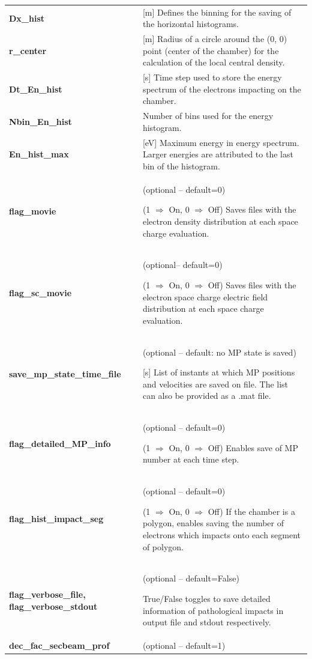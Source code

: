 \documentclass[a4paper,12pt]{article}
\begin{document}
\begin{longtable}{p{}p{}}
\hline\endfirsthead\hline\endhead\rowcolor{Gray}
\multicolumn{2}{p{.97\textwidth}}{
\textbf{Saving settings}
}\\ \hline
\textbf{Dx\_hist}& 	[m] Defines the binning for the saving of the horizontal histograms.\\ \hline
\textbf{r\_center}&	[m] Radius of a circle around the (0, 0) point (center of the chamber) for the calculation of the local central density.\\ \hline
\textbf{Dt\_En\_hist}&	[s] Time step used to store the energy spectrum  of the electrons impacting on the chamber.\\ \hline
\textbf{Nbin\_En\_hist}&	Number of bins used for the energy histogram.\\ \hline
\textbf{En\_hist\_max}& 	[eV] Maximum energy in energy spectrum. Larger energies are attributed to the last bin of the histogram.	\\ \hline
\textbf{flag\_movie}&	(optional -- default=0)

(1 $\Rightarrow$ On, 0 $\Rightarrow$ Off) Saves files with the electron density distribution at each space charge evaluation.\\ \hline
\textbf{flag\_sc\_movie}&	(optional-- default=0)

(1 $\Rightarrow$ On, 0 $\Rightarrow$ Off) Saves files with the electron space charge electric field distribution at each space charge evaluation.\\ \hline
\textbf{save\_mp\_state\_time\_file}&	(optional -- default: no MP state is saved)

[s] List of instants at which MP positions and velocities are saved on file. The list can also be provided as a .mat file.\\ \hline
\textbf{flag\_detailed\_MP\_info}&	(optional -- default=0)

(1 $\Rightarrow$ On, 0 $\Rightarrow$ Off) Enables save of MP number at each time step.\\ \hline
\textbf{flag\_hist\_impact\_seg}&	(optional -- default=0)

(1 $\Rightarrow$ On, 0 $\Rightarrow$ Off) If the chamber is a polygon, enables saving the number of electrons which impacts onto each segment of polygon.\\ \hline
\textbf{flag\_verbose\_file, flag\_verbose\_stdout}&	(optional -- default=False)

True/False toggles to save detailed information of pathological impacts in output file and stdout respectively.\\ \hline
\textbf{dec\_fac\_secbeam\_prof}&
	(optional -- default=1)
	

\end{longtable}
\end{document}
